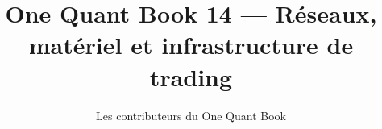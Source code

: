 \documentclass[11pt,a4paper,twoside,openany]{book}
\title{One Quant Book 14 --- Réseaux, matériel et infrastructure de trading}
\author{Les contributeurs du One Quant Book}
\date{\bookdate}
\begin{document}
\frontmatter



\tableofcontents

\mainmatter


\appendix
\part{\omsolutionspart}


\backmatter
\printindex
\end{document}
